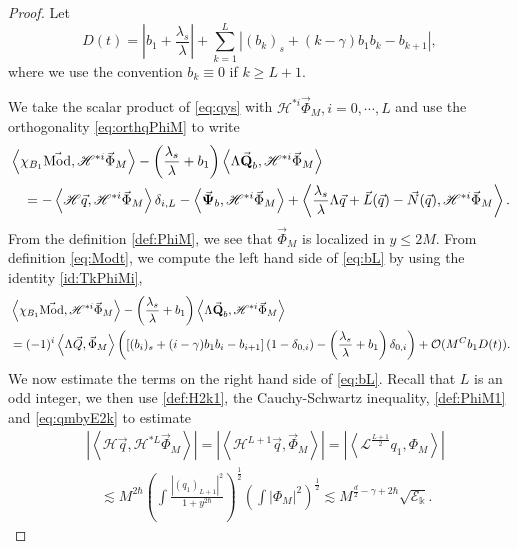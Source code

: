 \documentclass[11pt]{aims}
\theoremstyle{definition}
\numberwithin{equation}{section}
\begin{document}
\begin{proof} Let 
$$D(t) = \left|b_1 + \frac{\lambda_s}{\lambda}\right| + \sum_{k = 1}^L \left|(b_k)_s + (k - \gamma)b_1b_k - b_{k+1}\right|,$$
where we use the convention $b_{k} \equiv 0$ if $k \geq L + 1$.

We take the scalar product of \eqref{eq:qys} with ${\mathscr{H}}^{*i} \vec \Phi_M, i = 0, \cdots, L$ and use the orthogonality \eqref{eq:orthqPhiM} to write
\begin{align}
&\left<\chi_{B_1}\vec{\textup{Mod}}, {\mathscr{H}}^{*i}\vec\Phi_M\right> - \left(\frac{\lambda_s}{\lambda} + b_1\right)\left<\Lambda \vec{\textbf{Q}}_b, {\mathscr{H}}^{*i}\vec \Phi_M \right> \nonumber\\
&\quad  = - \left<{\mathscr{H}} \vec q, {\mathscr{H}}^{*i}\vec \Phi_M\right>\delta_{i,L}  - \left< \vec{\mathbf{\Psi}}_b, {\mathscr{H}}^{*i}\vec \Phi_M \right> + \left<\frac{\lambda_s}{\lambda}\Lambda \vec q + \vec L(\vec q) - \vec N(\vec q), {\mathscr{H}}^{*i}\vec \Phi_M \right>.\label{eq:bL}
\end{align}
From the definition \eqref{def:PhiM}, we see that $\vec \Phi_M$ is localized in $y \leq 2M$. From definition \eqref{eq:Modt}, we compute the left hand side of \eqref{eq:bL} by using the identity \eqref{id:TkPhiMi}, 
\begin{align*}
&\left<\chi_{B_1}\vec{\textup{Mod}}, {\mathscr{H}}^{*i}\vec\Phi_M\right> - \left(\frac{\lambda_s}{\lambda} + b_1\right)\left<\Lambda \vec{\textbf{Q}}_b, {\mathscr{H}}^{*i}\vec \Phi_M \right>\\
& = (-1)^i\left<\Lambda \vec Q, \vec \Phi_M \right>\left(\left[(b_i)_s + (i - \gamma)b_1b_i - b_{i + 1}\right](1 - \delta_{0,i}) - \left(\frac{\lambda_s}{\lambda} + b_1\right)\delta_{0,i} \right) + {\mathcal{O}}(M^C b_1D(t)).
\end{align*}
We now estimate the terms on the right hand side of \eqref{eq:bL}. Recall that $L$ is an odd integer, we then use \eqref{def:H2k1}, the Cauchy-Schwartz inequality, \eqref{def:PhiM1} and \eqref{eq:qmbyE2k} to estimate
\begin{align*}
&\left|\left<{\mathscr{H}} \vec q, {\mathscr{H}}^{*L}\vec \Phi_M\right>\right| = \left|\left<{\mathscr{H}}^{L+1} \vec q, \vec \Phi_M\right>\right| = \left|\left<{\mathscr{L}}^{\frac{L+1}2} q_1, \Phi_M\right>\right|\\
& \quad \lesssim  M^{2\hbar}\left(\int \frac{|(q_1)_{L+1}|^2}{1 + y^{2\hbar}} \right)^\frac 12 \left(\int |\Phi_M|^2 \right)^\frac 12 \lesssim M^{\frac d2 - \gamma + 2\hbar}\sqrt{{\mathscr{E}}_\Bbbk}.

\end{align*}
\end{proof}
\end{document}
